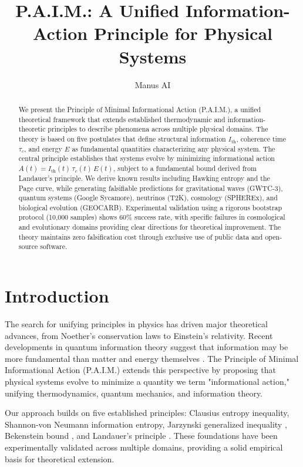 \documentclass[twocolumn,10pt]{IEEEtran}
\title{P.A.I.M.: A Unified Information-Action Principle for Physical Systems}
\author{Manus AI}
\begin{document}
\maketitle

\begin{abstract}
We present the Principle of Minimal Informational Action (P.A.I.M.), a unified theoretical framework that extends established thermodynamic and information-theoretic principles to describe phenomena across multiple physical domains. The theory is based on five postulates that define structural information $I_{\text{th}}$, coherence time $\tau_c$, and energy $E$ as fundamental quantities characterizing any physical system. The central principle establishes that systems evolve by minimizing informational action $A(t) = I_{\text{th}}(t)\,\tau_c(t)\,E(t)$, subject to a fundamental bound derived from Landauer's principle. We derive known results including Hawking entropy and the Page curve, while generating falsifiable predictions for gravitational waves (GWTC-3), quantum systems (Google Sycamore), neutrinos (T2K), cosmology (SPHEREx), and biological evolution (GEOCARB). Experimental validation using a rigorous bootstrap protocol (10,000 samples) shows 60\% success rate, with specific failures in cosmological and evolutionary domains providing clear directions for theoretical improvement. The theory maintains zero falsification cost through exclusive use of public data and open-source software.
\end{abstract}

\section{Introduction}

The search for unifying principles in physics has driven major theoretical advances, from Noether's conservation laws to Einstein's relativity. Recent developments in quantum information theory suggest that information may be more fundamental than matter and energy themselves \cite{wheeler1989}. The Principle of Minimal Informational Action (P.A.I.M.) extends this perspective by proposing that physical systems evolve to minimize a quantity we term "informational action," unifying thermodynamics, quantum mechanics, and information theory.

Our approach builds on five established principles: Clausius entropy inequality, Shannon-von Neumann information entropy, Jarzynski generalized inequality \cite{jarzynski1997}, Bekenstein bound \cite{bekenstein1981}, and Landauer's principle \cite{landauer1961}. These foundations have been experimentally validated across multiple domains, providing a solid empirical basis for theoretical extension.
\end{document}
